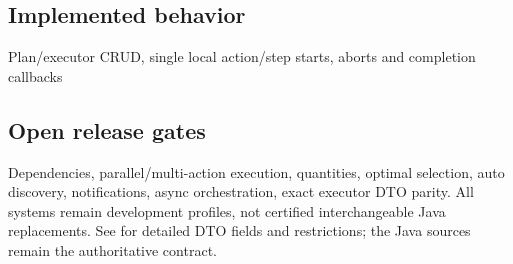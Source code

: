 \documentclass[a4paper]{arrowhead}
\begin{document}
\subsection{Implemented behavior}
Plan/executor CRUD, single local action/step starts, aborts and completion callbacks
\subsection{Open release gates}
Dependencies, parallel/multi-action execution, quantities, optimal selection, auto discovery, notifications, async orchestration, exact executor DTO parity. All systems remain development profiles, not certified interchangeable Java replacements. See  for detailed DTO fields and restrictions; the Java sources remain the authoritative contract.
\end{document}
